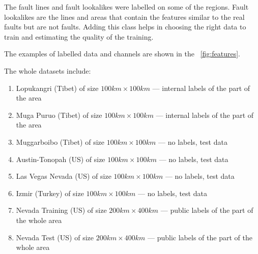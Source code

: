 \documentclass[11pt,a4paper]{article}
\begin{document}
The fault lines and fault lookalikes were labelled on some of the regions. Fault lookalikes are the lines and areas that
contain the features similar to the real faults but are not faults. Adding this class helps in choosing the right data
to train and estimating the quality of the training.

The examples of labelled data and channels are shown in the \figurename~\ref{fig:features}.

The whole datasets include:
\begin{enumerate}
\item Lopukangri (Tibet) of size $100 km \times 100 km$ --- internal labels of the part of the area
\item Muga Puruo (Tibet) of size $100 km \times 100 km$ --- internal labels of the part of the area
\item Muggarboibo (Tibet) of size $100 km \times 100 km$ --- no labels, test data
\item Austin-Tonopah (US) of size $100 km \times 100 km$ --- no labels, test data
\item Las Vegas Nevada (US) of size $100 km \times 100 km$ --- no labels, test data
\item Izmir (Turkey) of size $100 km \times 100 km$ --- no labels, test data
\item Nevada Training (US) of size $200 km \times 400 km$ --- public labels of the part of the whole area
\item Nevada Test (US) of size $200 km \times 400 km$ --- public labels of the part of the whole area
\end{enumerate}
\end{document}
